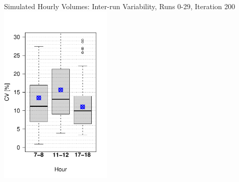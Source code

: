 {	{\label{fig:linkVolumesHour17-18InterScatter}}%
  {}%
	\createsubfigure%
  {Simulated Hourly Volumes: Inter-run Variability, Runs 0-29, Iteration 200}%
	{\includegraphics[width=0.4\textwidth]{understanding/figures/var/linkVolumesInter200.pdf}}%
	{\label{fig:linkVolumesInter200}}%
  {}%
}%
{} 


